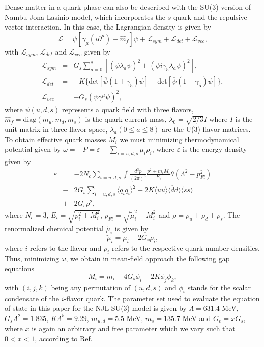 \documentclass[prc, reprint, amsmath, floatfix,10pt]{revtex4-1}
\begin{document}
Dense matter in a quark phase can also be described with the
SU(3) version of Nambu Jona Lasinio model, which incorporates the
$s$-quark and the repulsive vector interaction. In this case,
the Lagrangian density is given by
\begin{equation}
\mathscr{L}=\overline{\psi}[\gamma_\mu(i\partial^\mu)-\widehat{m}_f]\psi+
\mathscr{L}_{sym}+\mathscr{L}_{det}+\mathscr{L}_{vec},
\end{equation}
with $\mathscr{L}_{sym}$, $\mathscr{L}_{det}$ and $\mathscr{L}_{vec}$ given by
\begin{eqnarray}
\mathscr{L}_{sym}&=&G_s\sum_{a=0}^8[(\overline{\psi}\lambda_a\psi)^2+(\overline{\psi}i\gamma_5\lambda_a\psi)^2],\nonumber\\
\mathscr{L}_{det}&=&-K\{\mbox{det}[\overline{\psi}(1+\gamma_5)\psi]+\mbox{det}[\overline{\psi}(1-\gamma_5)\psi]\},\nonumber\\
\mathscr{L}_{vec}&=&-G_s(\overline{\psi}\gamma^\mu\psi)^2,\nonumber
\end{eqnarray}
where $\psi(u,d,s)$ represents a quark field with three flavors,
$\widehat{m}_f=\mbox{diag}(m_u,m_d,m_s)$ is the quark current mass,
$\lambda_0=\sqrt{2/3}I$ where $I$ is the unit matrix in three flavor space,
$\lambda_a(0\leq a \leq 8)$ are the U(3) flavor matrices. 
To obtain effective quark masses $M_i$ we must minimizing thermodynamical potential 
given by $\omega=-P=\varepsilon-\sum_{i=u,d,s}\mu_i\rho_i$, where $\varepsilon$ is the energy
density given by
\begin{eqnarray}
\varepsilon&=&-2N_c\sum_{i=u,d,s}\int\frac{d^3p}{(2\pi)^3}\frac{p^2+m_iM_i}{E_i}\theta(\Lambda^2-p_{Fi}^2)\nonumber\\
&-&2G_s\sum_{i=u,d,s}\langle\overline{q}_iq_i\rangle^2-2K\langle\overline{u}u\rangle\langle\overline{d}d\rangle\langle\overline{s}s\rangle\\
&+&2G_v\rho^2,\nonumber
\end{eqnarray}
where $N_c=3$, $E_i=\sqrt{p_i^2+M_i^2}$, $p_{Fi}=\sqrt{\widetilde{\mu}_i^2-M_i^2}$ and $\rho=\rho_u+\rho_d+\rho_s$.
The renormalized chemical potential $\widetilde{\mu}_i$ is given by
\begin{equation}
\widetilde{\mu}_i=\mu_i-2G_v\rho_i,
\end{equation}
where $i$ refers to the flavor and $\rho_i$ refers to the respective quark number densities. Thus,
minimizing $\omega$, we obtain in mean-field approach the following gap equations
\begin{equation}
M_i=m_i-4G_s\phi_i+2K\phi_j\phi_k,
\end{equation}
with $(i,j,k)$ being any permutation of $(u,d,s)$ and $\phi_i$ 
stands for the scalar condensate of the $i$-flavor quark.
The parameter set used to evaluate the equation of state in this paper
for the NJL SU(3) model is given by 
$\Lambda=631.4$ MeV, $G_s\Lambda^2=1.835$, $K\Lambda^5=9.29$, $m_{u,d}=5.5$ MeV, $m_s=135.7$ MeV
and $G_v=xG_s$, where $x$ is again an arbitrary and free parameter
which we vary  such that $0<x<1$, according to Ref. \cite{PhysRevD.64.043005} 
\end{document}
